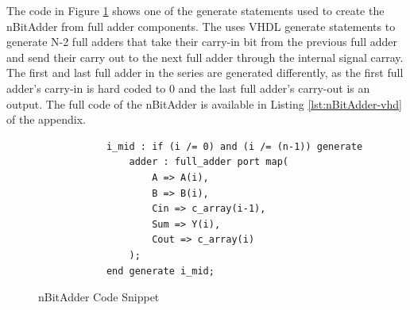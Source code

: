 \documentclass[11pt]{article}
\begin{document}
		The code in Figure \ref{code:nBitAdder} shows one of the generate statements used to create the nBitAdder from full adder components. The uses VHDL generate statements to generate N-2 full adders that take their carry-in bit from the previous full adder and send their carry out to the next full adder through the internal signal carray. The first and last full adder in the series are generated differently, as the first full adder's carry-in is hard coded to 0 and the last full adder's carry-out is an output. The full code of the nBitAdder is available in Listing \ref{lst:nBitAdder-vhd} of the appendix.
		
		\begin{figure}[H]
		\centering
		\begin{verbatim}
            i_mid : if (i /= 0) and (i /= (n-1)) generate
                adder : full_adder port map(
                    A => A(i),
                    B => B(i),
                    Cin => c_array(i-1),
                    Sum => Y(i),
                    Cout => c_array(i)
                );
            end generate i_mid;
        \end{verbatim}
        \caption{nBitAdder Code Snippet} 
    	\label{code:nBitAdder} 
    	\end{figure}
	
\end{document}
